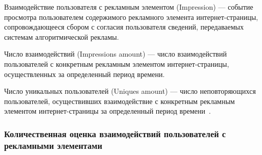 Взаимодействие пользователя с рекламным элементом (Impression) --- событие просмотра пользователем содержимого
рекламного элемента интернет-страницы, сопровождающееся сбором с согласия пользователя сведений, передаваемых 
системам алгоритмической рекламы.

Число взаимодействий (Impressions amount) --- число взаимодействий пользователей с конкретным рекламным элементом
интернет-страницы, осуществленных за определенный период времени.

Число уникальных пользователей (Uniques amount) --- число неповторяющихся пользователей, осуществивших взаимодействие
с конкретным рекламным элементом интернет-страницы за определенный период времени~\autocite{online:uniquesandimpressions}.

\subsubsection{Количественная оценка взаимодействий пользователей с рекламными элементами}

